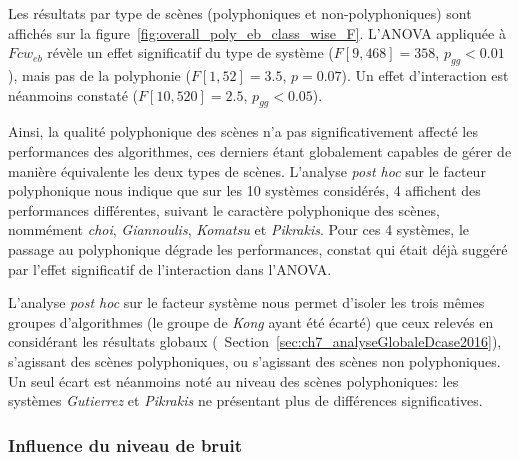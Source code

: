 Les résultats par type de scènes (polyphoniques et non-polyphoniques) sont affichés sur la figure~\ref{fig:overall_poly_eb_class_wise_F}. L'ANOVA appliquée à $Fcw_{eb}$ révèle un effet significatif du type de système ($F[9,468]=358$, $p_{gg}<0.01$), mais pas de la polyphonie ($F[1,52]=3.5$, $p=0.07$). Un effet d'interaction est néanmoins constaté ($F[10,520]=2.5$, $p_{gg}<0.05$).

Ainsi, la qualité polyphonique des scènes n'a pas significativement affecté les performances des algorithmes, ces derniers étant globalement capables de gérer de manière équivalente les deux types de scènes. L'analyse \emph{post hoc} sur le facteur polyphonique nous indique que sur les 10 systèmes considérés, 4 affichent des performances différentes, suivant le caractère polyphonique des scènes, nommément \emph{choi}, \emph{Giannoulis}, \emph{Komatsu} et \emph{Pikrakis}. Pour ces 4 systèmes, le passage au polyphonique dégrade les performances, constat qui était déjà suggéré par l'effet significatif de l'interaction dans l'ANOVA.

L'analyse \emph{post hoc} sur le facteur système nous permet d'isoler les trois mêmes groupes d'algorithmes (le groupe de \emph{Kong} ayant été écarté) que ceux relevés en considérant les résultats globaux (\cf~Section~\ref{sec:ch7_analyseGlobaleDcase2016}), s'agissant des scènes polyphoniques, ou s'agissant des scènes non polyphoniques. Un seul écart est néanmoins noté au niveau des scènes polyphoniques: les systèmes \emph{Gutierrez} et \emph{Pikrakis} ne présentant plus de différences significatives.

\subsubsection{Influence du niveau de bruit}

